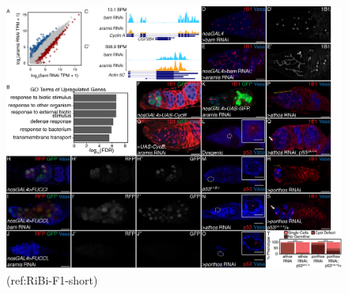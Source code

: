 \documentclass[12pt,oneside]{reedthesis}
\begin{document}
\begin{figure}

{\centering \includegraphics[width=7 in,height=5.409091 in]{./figure/Ribosome Biogenesis/Ribosome Biogenesis 3S} 

}

\caption[(ref:RiBi-F1-short)]{(ref:RiBi-F1-short)}\label{fig:unnamed-chunk-11}
\end{figure}
\end{document}
